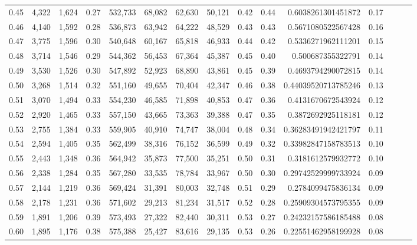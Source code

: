 \begin{tabular}{rrrrrrrrrrrrrrr}
0.45 &   4,322 &  1,624 &  0.27 &  532,733 &   68,082 &   62,630 &   50,121 &  0.42 &  0.44 &    0.6038261301451872 &      0.17 \\
0.46 &   4,140 &  1,592 &  0.28 &  536,873 &   63,942 &   64,222 &   48,529 &  0.43 &  0.43 &    0.5671080522567428 &      0.16 \\
0.47 &   3,775 &  1,596 &  0.30 &  540,648 &   60,167 &   65,818 &   46,933 &  0.44 &  0.42 &    0.5336271962111201 &      0.15 \\
0.48 &   3,714 &  1,546 &  0.29 &  544,362 &   56,453 &   67,364 &   45,387 &  0.45 &  0.40 &     0.500687355322791 &      0.14 \\
0.49 &   3,530 &  1,526 &  0.30 &  547,892 &   52,923 &   68,890 &   43,861 &  0.45 &  0.39 &    0.4693794290072815 &      0.14 \\
0.50 &   3,268 &  1,514 &  0.32 &  551,160 &   49,655 &   70,404 &   42,347 &  0.46 &  0.38 &   0.44039520713785246 &      0.13 \\
0.51 &   3,070 &  1,494 &  0.33 &  554,230 &   46,585 &   71,898 &   40,853 &  0.47 &  0.36 &    0.4131670672543924 &      0.12 \\
0.52 &   2,920 &  1,465 &  0.33 &  557,150 &   43,665 &   73,363 &   39,388 &  0.47 &  0.35 &    0.3872692925118181 &      0.12 \\
0.53 &   2,755 &  1,384 &  0.33 &  559,905 &   40,910 &   74,747 &   38,004 &  0.48 &  0.34 &   0.36283491942421797 &      0.11 \\
0.54 &   2,594 &  1,405 &  0.35 &  562,499 &   38,316 &   76,152 &   36,599 &  0.49 &  0.32 &   0.33982847158783513 &      0.10 \\
0.55 &   2,443 &  1,348 &  0.36 &  564,942 &   35,873 &   77,500 &   35,251 &  0.50 &  0.31 &    0.3181612579932772 &      0.10 \\
0.56 &   2,338 &  1,284 &  0.35 &  567,280 &   33,535 &   78,784 &   33,967 &  0.50 &  0.30 &   0.29742529999733924 &      0.09 \\
0.57 &   2,144 &  1,219 &  0.36 &  569,424 &   31,391 &   80,003 &   32,748 &  0.51 &  0.29 &    0.2784099475836134 &      0.09 \\
0.58 &   2,178 &  1,231 &  0.36 &  571,602 &   29,213 &   81,234 &   31,517 &  0.52 &  0.28 &   0.25909304573795355 &      0.09 \\
0.59 &   1,891 &  1,206 &  0.39 &  573,493 &   27,322 &   82,440 &   30,311 &  0.53 &  0.27 &   0.24232157586185488 &      0.08 \\
0.60 &   1,895 &  1,176 &  0.38 &  575,388 &   25,427 &   83,616 &   29,135 &  0.53 &  0.26 &   0.22551462958199928 &      0.08 \\

\end{tabular}
